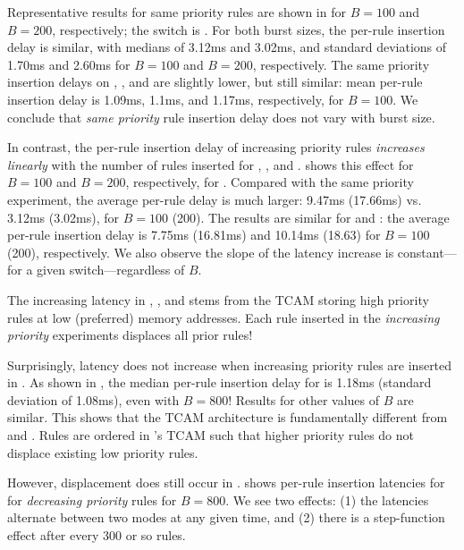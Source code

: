 Representative results for same priority rules are shown in 
 for
$B=100$ and $B=200$, respectively; the switch is \BroadcomOne. For both
burst sizes, the per-rule insertion delay is similar, with medians of 3.12ms
and 3.02ms, and standard deviations of 1.70ms and 2.60ms for $B=100$ and
$B=200$, respectively. The same priority insertion delays on \BroadcomThree,
\IBM, and \Intel are slightly lower, but still similar: mean per-rule
insertion delay is 1.09ms, 1.1ms, and 1.17ms, respectively, for $B=100$.  We
conclude that {\em same priority} rule insertion delay does not vary with burst
size.

In contrast, the per-rule insertion delay of increasing priority rules 
{\em increases linearly} with the number of rules inserted for \BroadcomOne,
\BroadcomThree, and \IBM.
 shows this
effect for $B=100$ and $B=200$, respectively, for \BroadcomOne.  Compared with
the same priority experiment, the average per-rule delay is much larger:
9.47ms (17.66ms) vs. 3.12ms (3.02ms), for $B=100$ (200). The results are
similar for \BroadcomThree and \IBM: the average per-rule insertion delay is
7.75ms (16.81ms) and 10.14ms (18.63) for $B=100$ (200), respectively. 
We also observe the slope of the latency increase is constant---for a given
switch---regardless of $B$.

The increasing latency in \BroadcomOne, \BroadcomThree, and \IBM stems from
the TCAM storing high priority rules at low (preferred) memory addresses. Each
rule inserted in the {\em increasing priority} experiments displaces all prior
rules!

Surprisingly, latency does not increase when increasing priority rules are
inserted in \Intel. As shown in , the
median per-rule insertion delay for \Intel is 1.18ms (standard deviation of
1.08ms), even with $B=800$! Results for other values of $B$ are similar.
This shows that the \Intel TCAM architecture is fundamentally different from
\Broadcom and \IBM. Rules are ordered in \Intel's TCAM such that higher
priority rules do not displace existing low priority rules. 

However, displacement does still occur in \Intel. 
 shows per-rule insertion latencies for
for {\em decreasing priority} rules for $B=800$. We see two effects: (1) the
latencies alternate between two modes at any given time, and (2) there is a
step-function effect after every 300 or so rules. 

